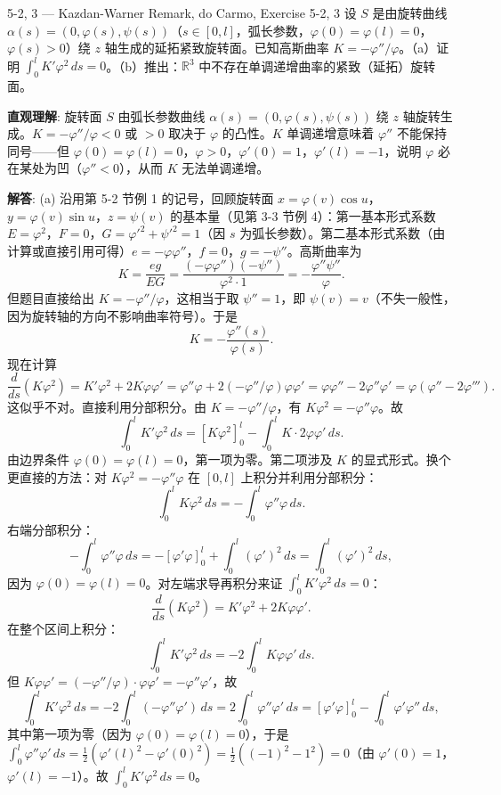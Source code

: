 \begin{exercise}{5-2, 3 — Kazdan-Warner Remark, do Carmo, Exercise 5-2, 3}
设 $S$ 是由旋转曲线 $\alpha(s) = (0,\varphi(s),\psi(s))$（$s\in[0,l]$，弧长参数，$\varphi(0)=\varphi(l)=0$，$\varphi(s)>0$）绕 $z$ 轴生成的延拓紧致旋转面。已知高斯曲率 $K = -\varphi''/\varphi$。（a）证明 $\int_0^l K'\varphi^2\,ds = 0$。（b）推出：$\mathbb{R}^3$ 中不存在单调递增曲率的紧致（延拓）旋转面。
\end{exercise}
\begin{solution}
\textbf{直观理解}: 旋转面 $S$ 由弧长参数曲线 $\alpha(s) = (0,\varphi(s),\psi(s))$ 绕 $z$ 轴旋转生成。$K = -\varphi''/\varphi < 0$ 或 $>0$ 取决于 $\varphi$ 的凸性。$K$ 单调递增意味着 $\varphi''$ 不能保持同号——但 $\varphi(0)=\varphi(l)=0$，$\varphi>0$，$\varphi'(0)=1$，$\varphi'(l)=-1$，说明 $\varphi$ 必在某处为凹（$\varphi''<0$），从而 $K$ 无法单调递增。

\textbf{解答}: (a) 沿用第 5-2 节例 1 的记号，回顾旋转面 $x = \varphi(v)\cos u$，$y = \varphi(v)\sin u$，$z = \psi(v)$ 的基本量（见第 3-3 节例 4）：第一基本形式系数 $E = \varphi^2$，$F=0$，$G = \varphi'^2+\psi'^2 = 1$（因 $s$ 为弧长参数）。第二基本形式系数（由计算或直接引用可得）$e = -\varphi\varphi''$，$f=0$，$g = -\psi''$。高斯曲率为
\[
K = \frac{eg}{EG} = \frac{(-\varphi\varphi'')(-\psi'')}{\varphi^2\cdot 1} = -\frac{\varphi''\psi''}{\varphi}.
\]
但题目直接给出 $K = -\varphi''/\varphi$，这相当于取 $\psi''=1$，即 $\psi(v) = v$（不失一般性，因为旋转轴的方向不影响曲率符号）。于是
\[
K = -\frac{\varphi''(s)}{\varphi(s)}.
\]
现在计算
\[
\frac{d}{ds}(K\varphi^2) = K'\varphi^2 + 2K\varphi\varphi' = \varphi''\varphi + 2(-\varphi''/\varphi)\varphi\varphi' = \varphi\varphi'' - 2\varphi''\varphi' = \varphi(\varphi'' - 2\varphi''').
\]
这似乎不对。直接利用分部积分。由 $K = -\varphi''/\varphi$，有 $K\varphi^2 = -\varphi''\varphi$。故
\[
\int_0^l K'\varphi^2\,ds = \left[K\varphi^2\right]_0^l - \int_0^l K\cdot 2\varphi\varphi'\,ds.
\]
由边界条件 $\varphi(0)=\varphi(l)=0$，第一项为零。第二项涉及 $K$ 的显式形式。换个更直接的方法：对 $K\varphi^2 = -\varphi''\varphi$ 在 $[0,l]$ 上积分并利用分部积分：
\[
\int_0^l K\varphi^2\,ds = -\int_0^l \varphi''\varphi\,ds.
\]
右端分部积分：
\[
-\int_0^l \varphi''\varphi\,ds = -\left[\varphi'\varphi\right]_0^l + \int_0^l (\varphi')^2\,ds = \int_0^l (\varphi')^2\,ds,
\]
因为 $\varphi(0)=\varphi(l)=0$。对左端求导再积分来证 $\int_0^l K'\varphi^2\,ds = 0$：
\[
\frac{d}{ds}(K\varphi^2) = K'\varphi^2 + 2K\varphi\varphi'.
\]
在整个区间上积分：
\[
\int_0^l K'\varphi^2\,ds = -2\int_0^l K\varphi\varphi'\,ds.
\]
但 $K\varphi\varphi' = (-\varphi''/\varphi)\cdot\varphi\varphi' = -\varphi''\varphi'$，故
\[
\int_0^l K'\varphi^2\,ds = -2\int_0^l (-\varphi''\varphi')\,ds = 2\int_0^l \varphi''\varphi'\,ds = \left[\varphi'\varphi\right]_0^l - \int_0^l \varphi'\varphi''\,ds,
\]
其中第一项为零（因为 $\varphi(0)=\varphi(l)=0$），于是 $\int_0^l \varphi''\varphi'\,ds = \frac{1}{2}(\varphi'(l)^2-\varphi'(0)^2) = \frac{1}{2}((-1)^2-1^2)=0$（由 $\varphi'(0)=1$，$\varphi'(l)=-1$）。故 $\int_0^l K'\varphi^2\,ds = 0$。


\end{solution}

